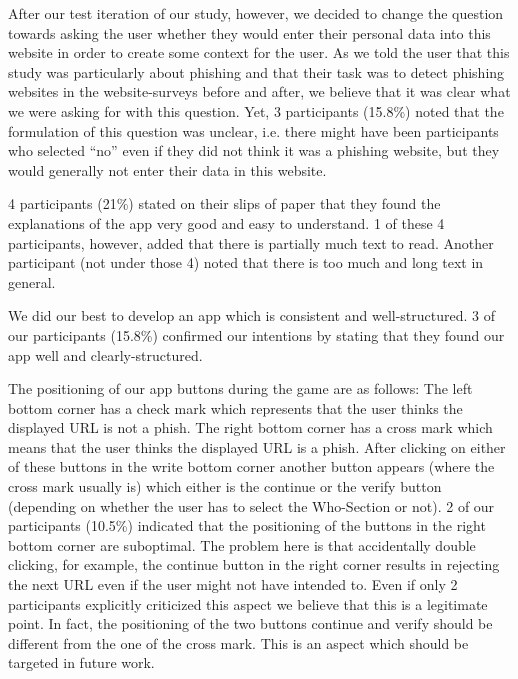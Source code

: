 \begin{description}[leftmargin=0cm]
After our test iteration of our study, however, we decided to change the question towards asking the user whether they would enter their personal data into this website in order to create some context for the user. 
As we told the user that this study was particularly about phishing and that their task was to detect phishing websites in the website-surveys before and after, we believe that it was clear what we were asking for with this question.
Yet, 3 participants (15.8\%) noted that the formulation of this question was unclear, i.e. there might have been participants who selected ``no'' even if they did not think it was a phishing website, but they would  generally not enter their data in this website.
	\item[Explanations and Comprehensibility]
4 participants (21\%) stated on their slips of paper that they found the explanations of the app very good and easy to understand.
1 of these 4 participants, however, added that there is partially much text to read.
Another participant (not under those 4) noted that there is too much and long text in general.
	\item[App Structure]
We did our best to develop an app which is consistent and well-structured.
3 of our participants (15.8\%) confirmed our intentions by stating that they found our app well and clearly-structured.
	\item[Button Positioning] The positioning of our app buttons during the game are as follows: 
The left bottom corner has a check mark which represents that the user thinks the displayed URL is not a phish.
The right bottom corner has a cross mark which means that the user thinks the displayed URL is a phish.
After clicking on either of these buttons in the write bottom corner another button appears (where the cross mark usually is) which either is the continue or the verify button (depending on whether the user has to select the Who-Section or not).
2 of our participants (10.5\%) indicated that the positioning of the buttons in the right bottom corner are suboptimal.
The problem here is that accidentally double clicking, for example, the continue button in the right corner results in rejecting the next URL even if the user might not have intended to.
Even if only 2 participants explicitly criticized this aspect we believe that this is a legitimate point.
In fact, the positioning of the two buttons continue and verify should be different from the one of the cross mark.
This is an aspect which should be targeted in future work. 
	\item[Repetition]

\end{description}
